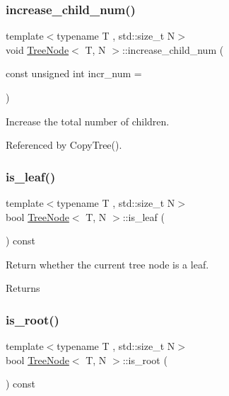 \subsubsection{\texorpdfstring{increase\+\_\+child\+\_\+num()}{increase\_child\_num()}}
{\footnotesize\ttfamily template$<$typename T , std\+::size\+\_\+t N$>$ \\
void \hyperlink{classTreeNode}{Tree\+Node}$<$ T, N $>$\+::increase\+\_\+child\+\_\+num (\begin{DoxyParamCaption}\item[{const unsigned int}]{incr\+\_\+num = {} }\end{DoxyParamCaption})}

Increase the total number of children. 

Referenced by Copy\+Tree().

\mbox{\label{classTreeNode_a64bf0bc987b1abe5ba10cdf32f093b58}} 
\subsubsection{\texorpdfstring{is\+\_\+leaf()}{is\_leaf()}}
{\footnotesize\ttfamily template$<$typename T , std\+::size\+\_\+t N$>$ \\
bool \hyperlink{classTreeNode}{Tree\+Node}$<$ T, N $>$\+::is\+\_\+leaf (\begin{DoxyParamCaption}{ }\end{DoxyParamCaption}) const}

Return whether the current tree node is a leaf. \begin{DoxyReturn}{Returns}

\end{DoxyReturn}
\mbox{\label{classTreeNode_ad2eb3a4d2a8d9dad252ee721bab24655}} 
\subsubsection{\texorpdfstring{is\+\_\+root()}{is\_root()}}
{\footnotesize\ttfamily template$<$typename T , std\+::size\+\_\+t N$>$ \\
bool \hyperlink{classTreeNode}{Tree\+Node}$<$ T, N $>$\+::is\+\_\+root (\begin{DoxyParamCaption}{ }\end{DoxyParamCaption}) const}

